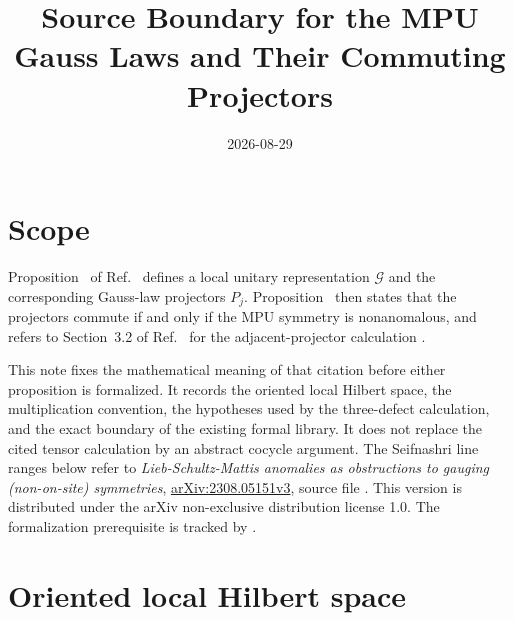 \documentclass{article}
\title{Source Boundary for the MPU Gauss Laws and Their Commuting Projectors}
\author{}
\date{2026-08-29}
\begin{document}
\maketitle
{}

\section{Scope}

Proposition~ of
Ref.~\cite[lines~3378--3499]{FrancoRubio2025MPUGauging} defines a local
unitary representation $\mathcal G$ and the corresponding Gauss-law
projectors $P_j$.  Proposition~ then states that the
projectors commute if and only if the MPU symmetry is nonanomalous, and refers
to Section~3.2 of Ref.~\cite{Seifnashri2024LSM} for the adjacent-projector
calculation \cite[lines~3602--3655]{FrancoRubio2025MPUGauging}.

This note fixes the mathematical meaning of that citation before either
proposition is formalized.  It records the oriented local Hilbert space, the
multiplication convention, the hypotheses used by the three-defect
calculation, and the exact boundary of the existing formal library.  It does
not replace the cited tensor calculation by an abstract cocycle argument.
The Seifnashri line ranges below refer to
\emph{Lieb-Schultz-Mattis anomalies as obstructions to gauging
(non-on-site) symmetries},
\href{https://arxiv.org/abs/2308.05151v3}{arXiv:2308.05151v3}, source file
.  This version is distributed under the arXiv
non-exclusive distribution license 1.0.
The formalization prerequisite is tracked by .

\section{Oriented local Hilbert space}
\end{document}

